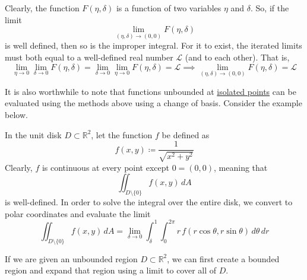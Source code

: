  Clearly, the function $F( \eta, \delta)$ is a function of two variables $\eta$ and $\delta$. So, if the limit 
  \begin{equation}
    \lim_{(\eta, \delta) \rightarrow (0, 0)} F(\eta, \delta)
  \end{equation}
  is well defined, then so is the improper integral. For it to exist, the iterated limits must both equal to a well-defined real number $\mathcal{L}$ (and to each other). That is, 
  \begin{equation}
    \lim_{\eta \rightarrow 0} \lim_{\delta \rightarrow 0} F(\eta, \delta) = \lim_{\delta \rightarrow 0} \lim_{\eta \rightarrow 0} F(\eta, \delta) = \mathcal{L} \implies \lim_{(\eta, \delta) \rightarrow (0,0)} F(\eta, \delta) = \mathcal{L}
  \end{equation}


  It is also worthwhile to note that functions unbounded at \hyperref[pst-def:isolated-point]{isolated points} can be evaluated using the methods above using a change of basis. Consider the example below. 

  \begin{example}
    \label{ex:integrating-over-the-unit-disk}
  In the unit disk $D \subset \mathbb{R}^2$, let the function $f$ be defined as 
  \begin{equation}
    f(x, y) \coloneqq \frac{1}{\sqrt{x^2 + y^2} }
  \end{equation}
  Clearly, $f$ is continuous at every point except $0= (0,0)$, meaning that 
  \begin{equation}
    \iint_{D \setminus \{0\}} f(x, y)\, dA
  \end{equation}
  is well-defined. In order to solve the integral over the entire disk, we convert to polar coordinates and evaluate the limit
  \begin{equation}
    \iint_{D \setminus \{0\}} f(x, y) \, dA = \lim_{\delta \rightarrow 0} \int_{\delta}^1 \int_0^{2 \pi} r \, f( r \cos{\theta}, r \sin{\theta}) \, d\theta \,dr
  \end{equation}
  \end{example}
  \begin{center}
  \end{center}

  If we are given an unbounded region $D \subset \mathbb{R}^2$, we can first create a bounded region and expand that region using a limit to cover all of $D$. 
